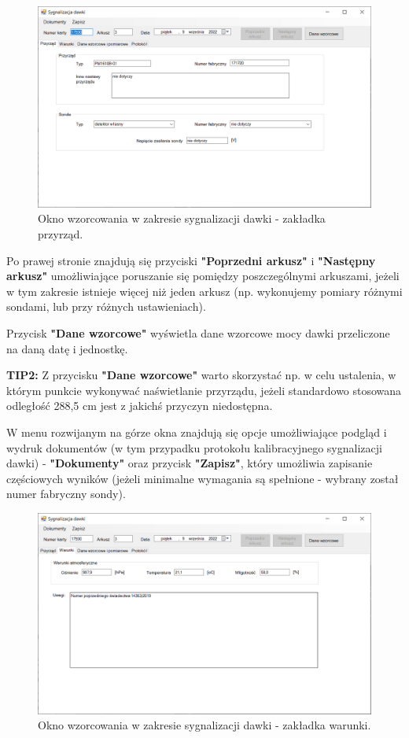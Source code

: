 {{{	\begin{figure}[htb]
		\centering
		\includegraphics[width=\columnwidth]{obrazki/Wzorcowanie/syg_dawki/przyrzad.png}
		\caption{Okno wzorcowania w zakresie sygnalizacji dawki - zakładka przyrząd.}
		\label{sygDawkiPrzyrzad}
	\end{figure}
	
	Po prawej stronie znajdują się przyciski \textbf{"Poprzedni arkusz"} i \textbf{"Następny arkusz"} umożliwiające poruszanie się pomiędzy poszczególnymi arkuszami, jeżeli w tym zakresie istnieje więcej niż jeden arkusz (np. wykonujemy pomiary różnymi sondami, lub przy różnych ustawieniach).
	
	Przycisk \textbf{"Dane wzorcowe"} wyświetla dane wzorcowe mocy dawki przeliczone na daną datę i jednostkę.
	
	\textbf{TIP2:} Z przycisku \textbf{"Dane wzorcowe"} warto skorzystać np. w celu ustalenia, w którym punkcie wykonywać naświetlanie przyrządu, jeżeli standardowo stosowana odległość 288,5 cm jest z jakichś przyczyn niedostępna.
	
	W menu rozwijanym na górze okna znajdują się opcje umożliwiające podgląd i wydruk dokumentów (w tym przypadku protokołu kalibracyjnego sygnalizacji dawki) - \textbf{"Dokumenty"} oraz przycisk \textbf{"Zapisz"}, który umożliwia zapisanie częściowych wyników (jeżeli minimalne wymagania są spełnione - wybrany został numer fabryczny sondy).
	
	\begin{figure}[htb]
		\centering
		\includegraphics[width=\columnwidth]{obrazki/Wzorcowanie/syg_dawki/warunki.png}
		\caption{Okno wzorcowania w zakresie sygnalizacji dawki - zakładka warunki.}
		\label{sygDawkiWarunki}
	\end{figure}
	
}}}
